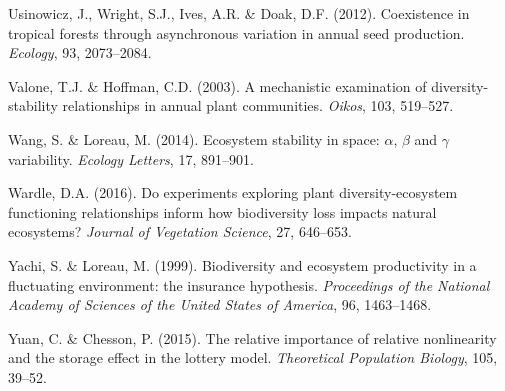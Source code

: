 \documentclass[12pt,]{article}
\begin{document}
\hypertarget{ref-Usinowicz2012}{}
Usinowicz, J., Wright, S.J., Ives, A.R. \& Doak, D.F. (2012).
Coexistence in tropical forests through asynchronous variation in annual
seed production. \emph{Ecology}, 93, 2073--2084.

\hypertarget{ref-Valone2003}{}
Valone, T.J. \& Hoffman, C.D. (2003). A mechanistic examination of
diversity-stability relationships in annual plant communities.
\emph{Oikos}, 103, 519--527.

\hypertarget{ref-Wang2014}{}
Wang, S. \& Loreau, M. (2014). Ecosystem stability in space: \(\alpha\),
\(\beta\) and \(\gamma\) variability. \emph{Ecology Letters}, 17,
891--901.

\hypertarget{ref-Wardle2016}{}
Wardle, D.A. (2016). Do experiments exploring plant diversity-ecosystem
functioning relationships inform how biodiversity loss impacts natural
ecosystems? \emph{Journal of Vegetation Science}, 27, 646--653.

\hypertarget{ref-Yachi1999}{}
Yachi, S. \& Loreau, M. (1999). Biodiversity and ecosystem productivity
in a fluctuating environment: the insurance hypothesis.
\emph{Proceedings of the National Academy of Sciences of the United
States of America}, 96, 1463--1468.

\hypertarget{ref-Yuan2015}{}
Yuan, C. \& Chesson, P. (2015). The relative importance of relative
nonlinearity and the storage effect in the lottery model.
\emph{Theoretical Population Biology}, 105, 39--52.
\end{document}
